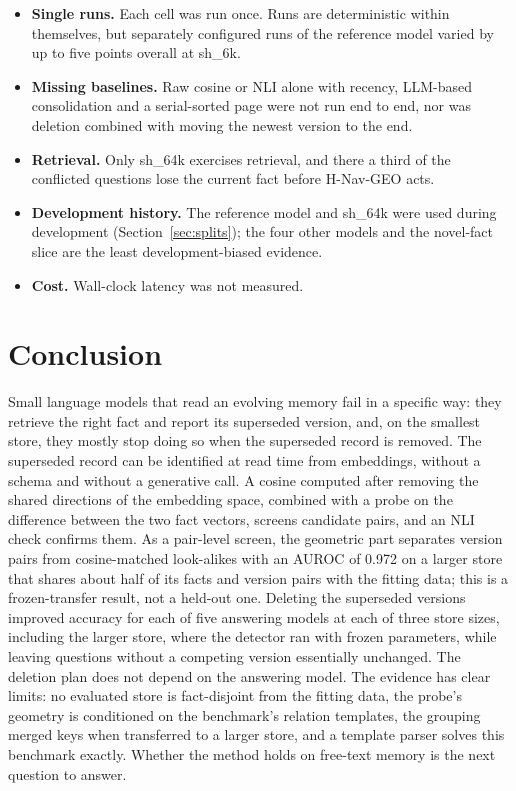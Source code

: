 \documentclass{CUP-JNL-NLP}
\newcommand{\sub}[1]{\textsf{sh\_#1}}                    %
\newcommand{\geo}{H-Nav-GEO}
\begin{document}
\begin{itemize}
\item \textbf{Single runs.} Each cell was run once. Runs are deterministic within themselves, but separately configured runs of the reference model varied by up to five points overall at \sub{6k}.
\item \textbf{Missing baselines.} Raw cosine or NLI alone with recency, LLM-based consolidation and a serial-sorted page were not run end to end, nor was deletion combined with moving the newest version to the end.
\item \textbf{Retrieval.} Only \sub{64k} exercises retrieval, and there a third of the conflicted questions lose the current fact before \geo{} acts.
\item \textbf{Development history.} The reference model and \sub{64k} were used during development (Section~\ref{sec:splits}); the four other models and the novel-fact slice are the least development-biased evidence.
\item \textbf{Cost.} Wall-clock latency was not measured.
\end{itemize}

\section{Conclusion}
\label{sec:conclusion}

Small language models that read an evolving memory fail in a specific way: they retrieve the right fact and report its superseded version, and, on the smallest store, they mostly stop doing so when the superseded record is removed. The superseded record can be identified at read time from embeddings, without a schema and without a generative call. A cosine computed after removing the shared directions of the embedding space, combined with a probe on the difference between the two fact vectors, screens candidate pairs, and an NLI check confirms them. As a pair-level screen, the geometric part separates version pairs from cosine-matched look-alikes with an AUROC of 0.972 on a larger store that shares about half of its facts and version pairs with the fitting data; this is a frozen-transfer result, not a held-out one. Deleting the superseded versions improved accuracy for each of five answering models at each of three store sizes, including the larger store, where the detector ran with frozen parameters, while leaving questions without a competing version essentially unchanged. The deletion plan does not depend on the answering model. The evidence has clear limits: no evaluated store is fact-disjoint from the fitting data, the probe's geometry is conditioned on the benchmark's relation templates, the grouping merged keys when transferred to a larger store, and a template parser solves this benchmark exactly. Whether the method holds on free-text memory is the next question to answer.
\end{document}
